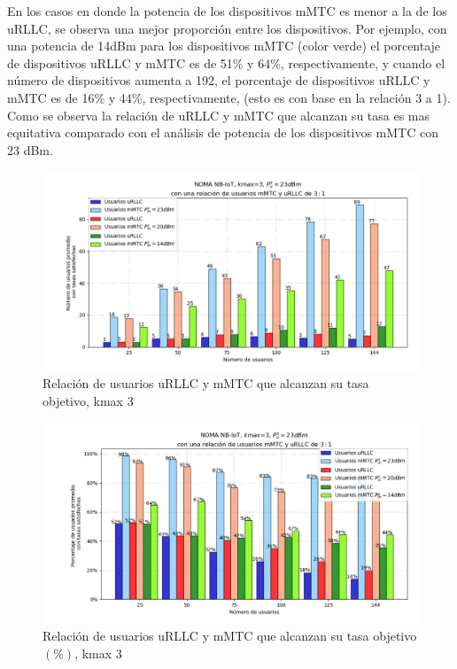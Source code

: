 En los casos en donde la potencia de los dispositivos mMTC es menor a la de los uRLLC, se observa una mejor proporción entre los dispositivos. Por ejemplo, con una potencia de 14dBm para los dispositivos mMTC (color verde) el porcentaje de dispositivos uRLLC y mMTC es de 51\% y 64\%, respectivamente, y cuando el número de dispositivos aumenta a 192, el porcentaje de dispositivos uRLLC y mMTC es de 16\% y 44\%, respectivamente, (esto es con base en la relación 3 a 1). Como se observa la relación de uRLLC y mMTC que alcanzan su tasa es mas equitativa comparado con el análisis de potencia de los dispositivos mMTC con 23 dBm. \newline

\break

\begin{figure}[th]
    \centering
    \includegraphics[scale=.65]{Figures/ResultadosNOMA/Kmax3_DiferentesPM.png}
    \decoRule
    \caption[Relación de usuarios uRLLC y mMTC que alcanzan su tasa objetivo, kmax 3]{Relación de usuarios uRLLC y mMTC que alcanzan su tasa objetivo, kmax 3}
    \label{fig:Kmax3_DiferentesPM}
\end{figure}

\begin{figure}[th]
    \centering
    \includegraphics[scale=.65]{Figures/ResultadosNOMA/Kmax3_DiferentesPM_Porcentual.png}
    \decoRule
    \caption[Relación de usuarios uRLLC y mMTC que alcanzan su tasa objetivo $(\%)$, kmax 3]{Relación de usuarios uRLLC y mMTC que alcanzan su tasa objetivo$(\%)$, kmax 3}
    \label{fig:Kmax3_DiferentesPM_Porcentual}
\end{figure}

